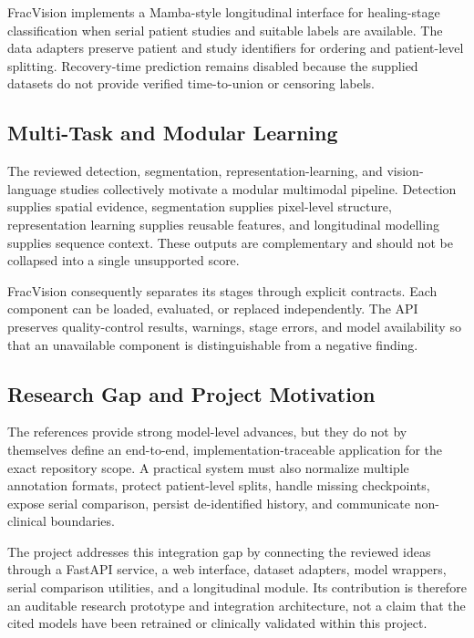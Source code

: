 \documentclass[12pt,a4paper]{article}
\begin{document}
FracVision implements a Mamba-style longitudinal interface for healing-stage classification when serial patient studies and suitable labels are available. The data adapters preserve patient and study identifiers for ordering and patient-level splitting. Recovery-time prediction remains disabled because the supplied datasets do not provide verified time-to-union or censoring labels.

\subsection{Multi-Task and Modular Learning}
The reviewed detection, segmentation, representation-learning, and vision-language studies collectively motivate a modular multimodal pipeline. Detection supplies spatial evidence, segmentation supplies pixel-level structure, representation learning supplies reusable features, and longitudinal modelling supplies sequence context. These outputs are complementary and should not be collapsed into a single unsupported score.

FracVision consequently separates its stages through explicit contracts. Each component can be loaded, evaluated, or replaced independently. The API preserves quality-control results, warnings, stage errors, and model availability so that an unavailable component is distinguishable from a negative finding.

\subsection{Research Gap and Project Motivation}
The references provide strong model-level advances, but they do not by themselves define an end-to-end, implementation-traceable application for the exact repository scope. A practical system must also normalize multiple annotation formats, protect patient-level splits, handle missing checkpoints, expose serial comparison, persist de-identified history, and communicate non-clinical boundaries.

The project addresses this integration gap by connecting the reviewed ideas through a FastAPI service, a web interface, dataset adapters, model wrappers, serial comparison utilities, and a longitudinal module. Its contribution is therefore an auditable research prototype and integration architecture, not a claim that the cited models have been retrained or clinically validated within this project.

\clearpage
\end{document}
